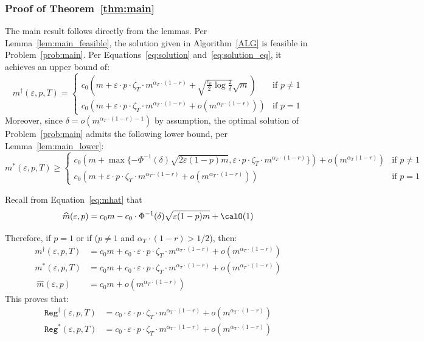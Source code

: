 \documentclass[blindrev]{informs3noheader}
\begin{document}
\subsubsection{Proof of Theorem~\ref{thm:main}}

The main result follows directly from the lemmas. Per Lemma~\ref{lem:main_feasible}, the solution given in Algorithm~\ref{ALG} is feasible in Problem~\eqref{prob:main}. Per Equations~\eqref{eq:solution} and~\eqref{eq:solution_eq}, it achieves an upper bound of:
$$m^\dagger(\varepsilon,p,T)=\begin{cases}
    c_0\left( m+\varepsilon\cdot p\cdot \zeta_T \cdot m^{\alpha_T\cdot(1-r)} +  \sqrt{\frac{c_0}{2}\log \frac{2}{\delta}}\sqrt{m}\right) &  \text{if }p\neq 1\\
c_0\left( m+\varepsilon\cdot p\cdot \zeta_T \cdot m^{\alpha_T\cdot(1-r)} +  o\left(m^{\alpha_T\cdot(1-r)}\right)\right) &  \text{if }p=1
\end{cases}$$
Moreover, since $\delta = o\left(m^{\alpha_T\cdot(1-r)-1}\right)$ by assumption, the optimal solution of Problem~\eqref{prob:main} admits the following lower bound, per Lemma~\ref{lem:main_lower}:
\[m^*(\varepsilon, p,T) \geq   \begin{cases}
c_0\left(m +\max\{-\Phi^{-1}(\delta)\sqrt{2\varepsilon(1-p)m},\varepsilon\cdot p\cdot\zeta_T\cdot m^{\alpha_T\cdot(1-r)}\}\right) +o\left(m^{\alpha_T(1-r)}\right)& \text{if }p \neq 1\\
  c_0\left(m + \varepsilon\cdot p\cdot\zeta_T\cdot m^{\alpha_T\cdot(1-r)} +  o\left(m^{\alpha_T\cdot(1-r)}\right)\right) & \text{if }p=1
\end{cases}\]

Recall from Equation~\eqref{eq:mhat} that
$$\widehat{m}(\varepsilon,p)=c_0m-c_0\cdot\Phi^{-1}(\delta)\sqrt{\varepsilon(1-p)m}+\calO(1)$$

Therefore, if $p=1$ or if ($p\neq1$ and $\alpha_T\cdot(1-r)>1/2$), then:
\begin{align*}
m^\dagger(\varepsilon,p,T)&=c_0m+c_0\cdot\varepsilon\cdot p\cdot \zeta_T \cdot m^{\alpha_T\cdot(1-r)} +  o\left(m^{\alpha_T\cdot(1-r)}\right)\\
m^*(\varepsilon,p,T)&=c_0m+c_0\cdot\varepsilon\cdot p\cdot \zeta_T \cdot m^{\alpha_T\cdot(1-r)} +  o\left(m^{\alpha_T\cdot(1-r)}\right)\\\
\widehat{m}(\varepsilon,p)&=c_0m+  o\left(m^{\alpha_T\cdot(1-r)}\right)
\end{align*}
This proves that:
\begin{align*}
\texttt{Reg}^\dagger(\varepsilon, p,T)&=
    c_0\cdot\varepsilon\cdot p\cdot\zeta_T\cdot m^{\alpha_T\cdot(1-r)}+o\left(m^{\alpha_T\cdot(1-r)}\right)\\
\texttt{Reg}^*(\varepsilon, p,T)&=
    c_0\cdot\varepsilon\cdot p\cdot\zeta_T\cdot m^{\alpha_T\cdot(1-r)}+o\left(m^{\alpha_T\cdot(1-r)}\right)
\end{align*}
\end{document}
